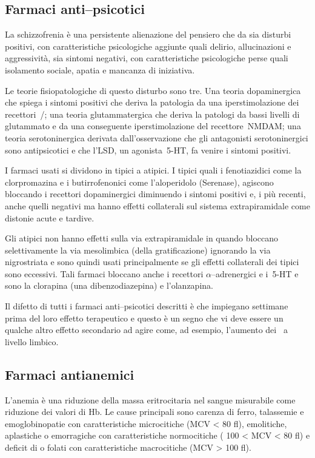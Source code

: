 \subsection{Farmaci anti--psicotici}

La schizzofrenia è una persistente alienazione del pensiero che da sia disturbi positivi, con caratteristiche psicologiche aggiunte quali delirio, allucinazioni e aggressività, sia sintomi negativi, con caratteristiche psicologiche perse quali isolamento sociale, apatia e mancanza di iniziativa.

Le teorie fisiopatologiche di questo disturbo sono tre. Una teoria dopaminergica che spiega i sintomi positivi che deriva la patologia da una iperstimolazione dei recettori~/; una teoria glutammatergica che deriva la patologi da bassi livelli di glutammato e da una conseguente iperstimolazione del recettore~NMDAM; una teoria serotoninergica derivata dall'osservazione che gli antagonisti serotoninergici sono antipsicotici e che l'LSD, un agonista~5-HT, fa venire i sintomi positivi.

I farmaci usati si dividono in tipici a atipici. I tipici quali i fenotiazidici come la clorpromazina e i butirrofenonici come l'aloperidolo (Serenase), agiscono bloccando i recettori dopaminergici diminuendo i sintomi positivi e, i più recenti, anche quelli negativi ma hanno effetti collaterali sul sistema extrapiramidale come distonie acute e tardive. 

Gli atipici non hanno effetti sulla via extrapiramidale in quando bloccano selettivamente la via mesolimbica (della gratificazione) ignorando la via nigrostriata e sono quindi usati principalmente se gli effetti collaterali dei tipici sono eccessivi. Tali farmaci bloccano anche i recettori $\alpha$--adrenergici e i~5-HT e sono la clorapina (una dibenzodiazepina) e l'olanzapina.

Il difetto di tutti i farmaci anti--psicotici descritti è che impiegano settimane prima del loro effetto terapeutico e questo è un segno che vi deve essere un qualche altro effetto secondario ad agire come, ad esempio, l'aumento dei~ a livello limbico.

\subsection{Farmaci antianemici}

L'anemia è una riduzione della massa eritrocitaria nel sangue misurabile come riduzione dei valori di Hb. Le cause principali sono carenza di ferro, talassemie e emoglobinopatie con caratteristiche microcitiche (MCV < 80 fl), emolitiche, aplastiche o emorragiche con caratteristiche normocitiche ( 100 < MCV < 80 fl) e deficit di  o folati con caratteristiche macrocitiche (MCV > 100 fl).

